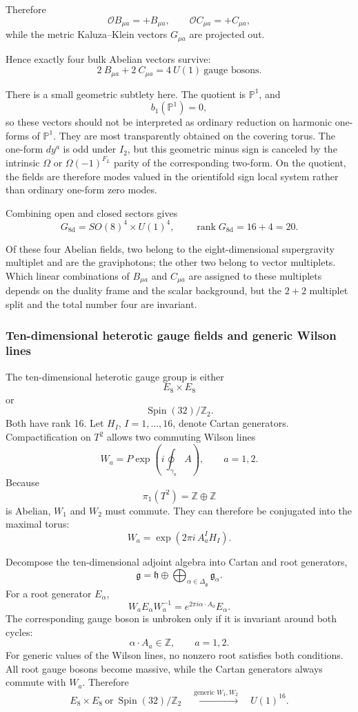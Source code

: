 \documentclass[
  10pt,
  a4paper,
  openany]{book}
\begin{document}
Therefore \[
\boxed{
\mathcal O B_{\mu a}=+B_{\mu a},
\qquad
\mathcal O C_{\mu a}=+C_{\mu a}
},
\] while the metric Kaluza--Klein vectors \(G_{\mu a}\) are projected
out.

Hence exactly four bulk Abelian vectors survive: \[
\boxed{
2\ B_{\mu a}
+2\ C_{\mu a}
=4\ U(1)\ \text{gauge bosons}
}.
\]

There is a small geometric subtlety here. The quotient is
\(\mathbb P^1\), and \[
b_1(\mathbb P^1)=0,
\] so these vectors should not be interpreted as ordinary reduction on
harmonic one-forms of \(\mathbb P^1\). They are most transparently
obtained on the covering torus. The one-form \(dy^a\) is odd under
\(I_2\), but this geometric minus sign is canceled by the intrinsic
\(\Omega\) or \(\Omega(-1)^{F_L}\) parity of the corresponding two-form.
On the quotient, the fields are therefore modes valued in the
orientifold sign local system rather than ordinary one-form zero modes.

Combining open and closed sectors gives \[
\boxed{
G_{\mathrm{8d}}
=SO(8)^4\times U(1)^4,
\qquad
\operatorname{rank}G_{\mathrm{8d}}
=16+4
=20
}.
\]

Of these four Abelian fields, two belong to the eight-dimensional
supergravity multiplet and are the graviphotons; the other two belong to
vector multiplets. Which linear combinations of \(B_{\mu a}\) and
\(C_{\mu a}\) are assigned to these multiplets depends on the duality
frame and the scalar background, but the \(2+2\) multiplet split and the
total number four are invariant.

\subsubsection{Ten-dimensional heterotic gauge fields and generic Wilson
lines}\label{ten-dimensional-heterotic-gauge-fields-and-generic-wilson-lines}

The ten-dimensional heterotic gauge group is either \[
E_8\times E_8
\] or \[
\operatorname{Spin}(32)/\mathbb Z_2.
\] Both have rank 16. Let \(H_I\), \(I=1,\ldots,16\), denote Cartan
generators. Compactification on \(T^2\) allows two commuting Wilson
lines \[
W_a
=P\exp\left(i\oint_{\gamma_a}A\right),
\qquad
a=1,2.
\] Because \[
\pi_1(T^2)=\mathbb Z\oplus\mathbb Z
\] is Abelian, \(W_1\) and \(W_2\) must commute. They can therefore be
conjugated into the maximal torus: \[
W_a
=\exp\left(2\pi i\,A_a^IH_I\right).
\]

Decompose the ten-dimensional adjoint algebra into Cartan and root
generators, \[
\mathfrak g
=\mathfrak h
\oplus
\bigoplus_{\alpha\in\Delta_{\mathfrak g}}\mathfrak g_\alpha.
\] For a root generator \(E_\alpha\), \[
W_aE_\alpha W_a^{-1}
=e^{2\pi i\alpha\cdot A_a}E_\alpha.
\] The corresponding gauge boson is unbroken only if it is invariant
around both cycles: \[
\alpha\cdot A_a\in\mathbb Z,
\qquad
a=1,2.
\] For generic values of the Wilson lines, no nonzero root satisfies
both conditions. All root gauge bosons become massive, while the Cartan
generators always commute with \(W_a\). Therefore \[
\boxed{
E_8\times E_8
\ \text{or}\
\operatorname{Spin}(32)/\mathbb Z_2
\quad\xrightarrow{\text{generic }W_1,W_2}\quad
U(1)^{16}
}.
\]
\end{document}
